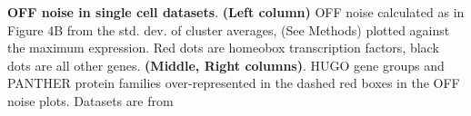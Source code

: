 \textbf{OFF noise in single cell datasets}. \textbf{(Left column)} OFF noise calculated as in Figure 4B from the std. dev. of cluster averages, (See Methods) plotted against the maximum expression. Red dots are homeobox transcription factors, black dots are all other genes. \textbf{(Middle, Right columns)}. HUGO gene groups and PANTHER protein families over-represented in the dashed red boxes in the OFF noise plots. %
Datasets are from \citep{Zeisel_2015,Tasic_2016,Zeisel_2018,Saunders_2018}